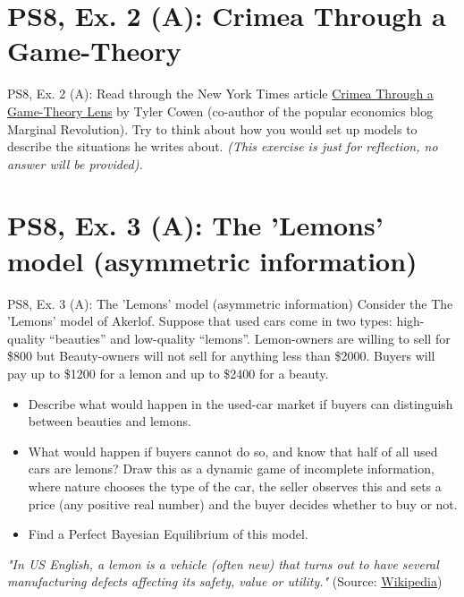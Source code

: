 \section{PS8, Ex. 2 (A): Crimea Through a Game-Theory }

\begin{frame}{PS8, Ex. 2 (A): }
    Read through the New York Times article \href{https://www.nytimes.com/2014/03/16/business/crimea-through-a-game-theory-lens.html}{Crimea Through a Game-Theory Lens} by Tyler Cowen (co-author of the popular economics blog Marginal Revolution). Try to think about how you would set up models to describe the situations he writes about. \textit{(This exercise is just for reflection, no answer will be provided).}
\end{frame}



\section{PS8, Ex. 3 (A): The 'Lemons' model (asymmetric information)}

\begin{frame}{PS8, Ex. 3 (A): The 'Lemons' model (asymmetric information)}
    Consider the The 'Lemons' model of Akerlof. Suppose that used cars come in two types: high-quality “beauties” and low-quality “lemons”. Lemon-owners are willing to sell for \$800 but Beauty-owners will not sell for anything less than \$2000. Buyers will pay up to \$1200 for a lemon and up to \$2400 for a beauty.
    \begin{itemize}
      \item[(a)] Describe what would happen in the used-car market if buyers can distinguish between beauties and lemons.
      \item[(b)] What would happen if buyers cannot do so, and know that half of all used cars are lemons? Draw this as a dynamic game of incomplete information, where nature chooses the type of the car, the seller observes this and sets a price (any positive real number) and the buyer decides whether to buy or not.
      \item[(c)] Find a Perfect Bayesian Equilibrium of this model.
    \end{itemize}
    \textit{"In US English, a lemon is a vehicle (often new) that turns out to have several manufacturing defects affecting its safety, value or utility."} (Source: \href{https://en.wikipedia.org/wiki/Lemon_(automobile)}{Wikipedia})
\end{frame}

